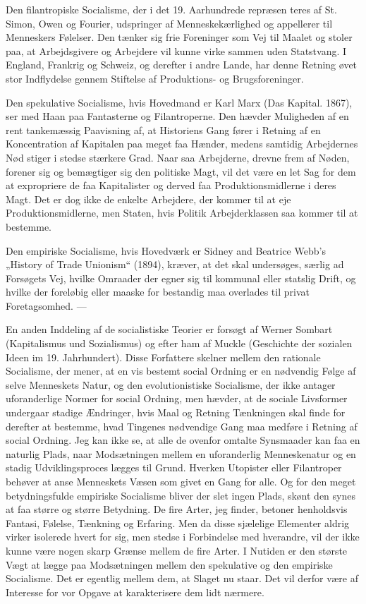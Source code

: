 \documentclass[12pt,a4paper,openany]{book}
\newcommand{\opage}[1]{\marginnote{\footnotesize\textit{[#1]}}}
\begin{document}
Den filantropiske Socialisme, der i det 19. Aarhundrede repræsen%
\opage{94}teres af St. Simon, Owen og Fourier, udspringer af Menneskekærlighed
og appellerer til Menneskers Følelser. Den tænker sig frie Foreninger
som Vej til Maalet og stoler paa, at Arbejdsgivere og Arbejdere
vil kunne virke sammen uden Statstvang. I England, Frankrig
og Schweiz, og derefter i andre Lande, har denne Retning øvet stor
Indflydelse gennem Stiftelse af Produktions- og Brugsforeninger.

Den spekulative Socialisme, hvis Hovedmand er Karl Marx (Das
Kapital. 1867), ser med Haan paa Fantasterne og Filantroperne. Den
hævder Muligheden af en rent tankemæssig Paavisning af, at Historiens
Gang fører i Retning af en Koncentration af Kapitalen paa meget
faa Hænder, medens samtidig Arbejdernes Nød stiger i stedse
stærkere Grad. Naar saa Arbejderne, drevne frem af Nøden, forener
sig og bemægtiger sig den politiske Magt, vil det være en let Sag
for dem at expropriere de faa Kapitalister og derved faa Produktionsmidlerne
i deres Magt. Det er dog ikke de enkelte Arbejdere,
der kommer til at eje Produktionsmidlerne, men Staten, hvis Politik
Arbejderklassen saa kommer til at bestemme.

Den empiriske Socialisme, hvis Hovedværk er Sidney and Beatrice
Webb’s „History of Trade Unionism“ (1894), kræver, at det skal undersøges,
særlig ad Forsøgets Vej, hvilke Omraader der egner sig
til kommunal eller statslig Drift, og hvilke der foreløbig eller maaske
for bestandig maa overlades til privat Foretagsomhed. ---

En anden Inddeling af de socialistiske Teorier er forsøgt af Werner
Sombart (Kapitalismus und Sozialismus) og efter ham af Muckle
(Geschichte der sozialen Ideen im 19. Jahrhundert). Disse Forfattere
skelner mellem den rationale Socialisme, der mener, at en vis
bestemt social Ordning er en nødvendig Følge af selve Menneskets
Natur, og den evolutionistiske Socialisme, der ikke antager uforanderlige
Normer for social Ordning, men hævder, at de sociale Livsformer
undergaar stadige Ændringer, hvis Maal og Retning Tænkningen
skal finde for derefter at bestemme, hvad Tingenes nødvendige
Gang maa medføre i Retning af social Ordning. Jeg kan ikke
se, at alle de ovenfor omtalte Synsmaader kan faa en naturlig Plads,
naar Modsætningen mellem en uforanderlig Menneskenatur og en
stadig Udviklingsproces lægges til Grund. Hverken Utopister eller
Filantroper behøver at anse Menneskets Væsen som givet en Gang
for alle. Og for den meget betydningsfulde empiriske Socialisme
bliver der slet ingen Plads, skønt den synes at faa større og større
Betydning. De fire Arter, jeg finder, betoner henholdsvis Fantasi,
Følelse, Tænkning og Erfaring. Men da disse sjælelige Elementer
\opage{95}aldrig virker isolerede hvert for sig, men stedse i Forbindelse med
hverandre, vil der ikke kunne være nogen skarp Grænse mellem de
fire Arter. I Nutiden er den største Vægt at lægge paa Modsætningen
mellem den spekulative og den empiriske Socialisme. Det er
egentlig mellem dem, at Slaget nu staar. Det vil derfor være af Interesse
for vor Opgave at karakterisere dem lidt nærmere.
\end{document}
